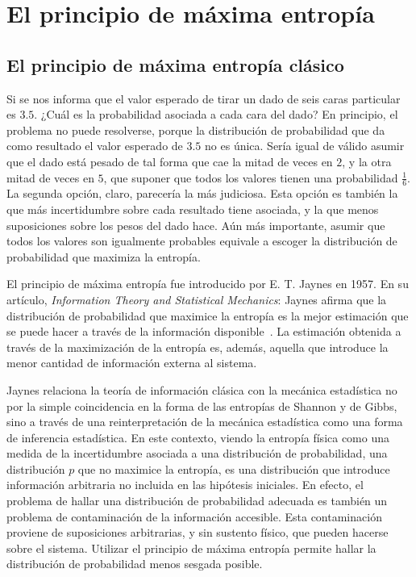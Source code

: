 \section{El principio de máxima entropía}\label{sec:CH1MaxEnt}



\subsection{El principio de máxima entropía clásico}

Si se nos informa que el valor esperado de tirar un dado de seis caras particular es $3.5$. ¿Cuál es la probabilidad asociada a cada cara del dado? En principio, el problema no puede resolverse, porque la distribución de probabilidad que da como resultado el valor esperado de $3.5$ no es única. Sería igual de válido asumir que el dado está pesado de tal forma que cae la mitad de veces en $2$, y la otra mitad de veces en $5$, que suponer que todos los valores tienen una probabilidad $\frac{1}{6}$. La segunda opción, claro, parecería la más judiciosa. Esta opción es también la que más incertidumbre sobre cada resultado tiene asociada, y la que menos suposiciones sobre los pesos del dado hace. Aún más importante, asumir que todos los valores son igualmente probables equivale a escoger la distribución de probabilidad que maximiza la entropía.

El principio de máxima entropía fue introducido por E. T. Jaynes en 1957. En su artículo, \textit{Information Theory and Statistical Mechanics}: Jaynes afirma que la distribución de probabilidad que maximice la entropía es la mejor estimación que se puede hacer a través de la información disponible~\cite{JaynesI}. La estimación obtenida a través de la maximización de la entropía es, además, aquella que introduce la menor cantidad de información externa al sistema.

Jaynes relaciona la teoría de información clásica con la mecánica estadística no por la simple coincidencia en la forma de las entropías de Shannon y de Gibbs, sino a través de una reinterpretación de la mecánica estadística como una forma de inferencia estadística. En este contexto, viendo la entropía física como una medida de la incertidumbre asociada a una distribución de probabilidad, una distribución $p$ que no maximice la entropía, es una distribución que introduce información arbitraria no incluida en las hipótesis iniciales. En efecto, el problema de hallar una distribución de probabilidad adecuada es también un problema de contaminación de la información accesible. Esta contaminación proviene de suposiciones arbitrarias, y sin sustento físico, que pueden hacerse sobre el sistema. Utilizar el principio de máxima entropía permite hallar la distribución de probabilidad menos sesgada posible.

